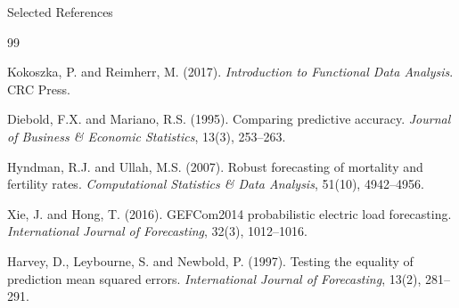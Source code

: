 \documentclass[10pt,aspectratio=169]{beamer}
\begin{document}
\begin{frame}{Selected References}
  \footnotesize
  \begin{thebibliography}{99}

    Kokoszka, P. and Reimherr, M. (2017).
    \newblock \textit{Introduction to Functional Data Analysis}. CRC Press.

    Diebold, F.X. and Mariano, R.S. (1995).
    \newblock Comparing predictive accuracy.
    \newblock \textit{Journal of Business \& Economic Statistics}, 13(3), 253--263.

    Hyndman, R.J. and Ullah, M.S. (2007).
    \newblock Robust forecasting of mortality and fertility rates.
    \newblock \textit{Computational Statistics \& Data Analysis}, 51(10), 4942--4956.

    Xie, J. and Hong, T. (2016).
    \newblock GEFCom2014 probabilistic electric load forecasting.
    \newblock \textit{International Journal of Forecasting}, 32(3), 1012--1016.

    Harvey, D., Leybourne, S. and Newbold, P. (1997).
    \newblock Testing the equality of prediction mean squared errors.
    \newblock \textit{International Journal of Forecasting}, 13(2), 281--291.

  \end{thebibliography}
\end{frame}
\end{document}
